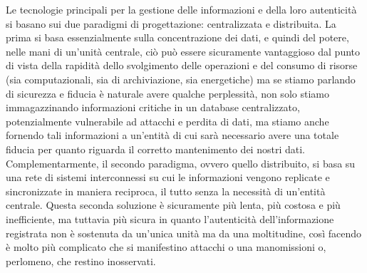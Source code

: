Le tecnologie principali per la gestione delle informazioni e della loro autenticità
si basano sui due paradigmi di progettazione: centralizzata e distribuita.
La prima si basa essenzialmente sulla concentrazione dei dati, e quindi del potere,
nelle mani di un’unità centrale, ciò può essere sicuramente vantaggioso dal punto di
vista della rapidità dello svolgimento delle operazioni e del consumo di risorse
(sia computazionali, sia di archiviazione, sia energetiche) ma se stiamo parlando di
sicurezza e fiducia è naturale avere qualche perplessità, non solo stiamo immagazzinando
informazioni critiche in un database centralizzato, potenzialmente vulnerabile ad attacchi
e perdita di dati, ma stiamo anche fornendo tali informazioni a un’entità di cui sarà
necessario avere una totale fiducia per quanto riguarda il corretto mantenimento dei
nostri dati. \\
Complementarmente, il secondo paradigma, ovvero quello distribuito, si basa
su una rete di sistemi interconnessi su cui le informazioni vengono replicate e sincronizzate
in maniera reciproca, il tutto senza la necessità di un’entità centrale.
Questa seconda soluzione è sicuramente più lenta, più costosa e più inefficiente,
ma tuttavia più sicura in quanto l’autenticità dell’informazione registrata non è sostenuta
da un’unica unità ma da una moltitudine, così facendo è molto più complicato che si
manifestino attacchi o una manomissioni o, perlomeno, che restino inosservati. 

